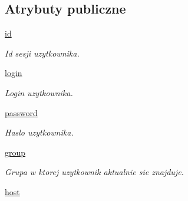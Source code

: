 \subsection*{Atrybuty publiczne}
\begin{CompactItemize}
\item 
\hypertarget{class_serv_1_1_user_1_1_user_9ccda7549874ecd0e505e47ab9f7e2f7}{
\hyperlink{class_serv_1_1_user_1_1_user_9ccda7549874ecd0e505e47ab9f7e2f7}{id}}
\label{class_serv_1_1_user_1_1_user_9ccda7549874ecd0e505e47ab9f7e2f7}

\begin{CompactList}\small\item\em Id sesji uzytkownika. \item\end{CompactList}\item 
\hypertarget{class_serv_1_1_user_1_1_user_26c268efd71044c8d201de3f2cc75ae1}{
\hyperlink{class_serv_1_1_user_1_1_user_26c268efd71044c8d201de3f2cc75ae1}{login}}
\label{class_serv_1_1_user_1_1_user_26c268efd71044c8d201de3f2cc75ae1}

\begin{CompactList}\small\item\em Login uzytkownika. \item\end{CompactList}\item 
\hypertarget{class_serv_1_1_user_1_1_user_ee1a7e306077b5c7b94746c088fd6807}{
\hyperlink{class_serv_1_1_user_1_1_user_ee1a7e306077b5c7b94746c088fd6807}{password}}
\label{class_serv_1_1_user_1_1_user_ee1a7e306077b5c7b94746c088fd6807}

\begin{CompactList}\small\item\em Haslo uzytkownika. \item\end{CompactList}\item 
\hypertarget{class_serv_1_1_user_1_1_user_244ae8ec25ad4fd34379c275a3f71267}{
\hyperlink{class_serv_1_1_user_1_1_user_244ae8ec25ad4fd34379c275a3f71267}{group}}
\label{class_serv_1_1_user_1_1_user_244ae8ec25ad4fd34379c275a3f71267}

\begin{CompactList}\small\item\em Grupa w ktorej uzytkownik aktualnie sie znajduje. \item\end{CompactList}\item 
\hypertarget{class_serv_1_1_user_1_1_user_b8dc612b892abb8d84cd2149cc3c5f3c}{
\hyperlink{class_serv_1_1_user_1_1_user_b8dc612b892abb8d84cd2149cc3c5f3c}{host}}
\label{class_serv_1_1_user_1_1_user_b8dc612b892abb8d84cd2149cc3c5f3c}


\end{CompactItemize}
